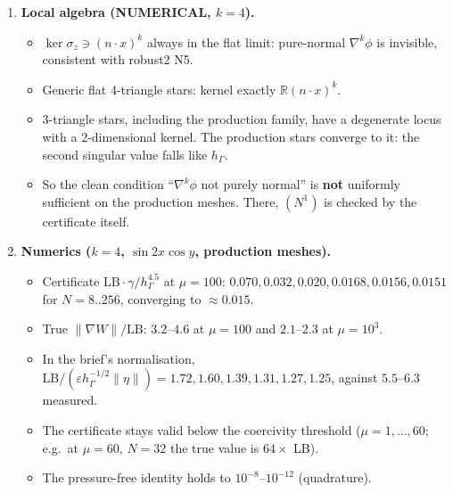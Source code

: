 \documentclass[11pt]{article}
\theoremstyle{remark}
\newcommand{\hG}{h_\Gamma}
\begin{document}
\begin{enumerate}
Combined with the upper bound of robust/ Thm~3.2(b), this gives
\[
c\,\gamma^{-1}\hG^{k+1/2}\le\|\nabla W_\ast\|\le C\gamma^{-1}\hG^{k+1/2}\qquad\text{for all }\gamma\ge\max(\gamma_2,1).
\]
This is the sharp order on the whole coercive range, and the lower half extends below it.
\item \textbf{Local algebra (NUMERICAL, $k=4$).}
 \begin{itemize}
 \item $\ker\sigma_z\ni(n\cdot x)^k$ always in the flat limit: pure-normal $\nabla^k\phi$ is invisible, consistent with robust2 N5.
 \item Generic flat 4-triangle stars: kernel exactly $\mathbb R(n\cdot x)^k$.
 \item 3-triangle stars, including the production family, have a degenerate locus with a 2-dimensional kernel. The
 production stars converge to it: the second singular value falls like $\hG$.
 \item So the clean condition ``$\nabla^k\phi$ not purely normal'' is \textbf{not} uniformly sufficient on the production
 meshes. There, $(N^1)$ is checked by the certificate itself.
 \end{itemize}
\item \textbf{Numerics ($k=4$, $\sin2x\cos y$, production meshes).}
 \begin{itemize}
 \item Certificate $\mathrm{LB}\cdot\gamma/\hG^{4.5}$ at $\mu=100$: $0.070,0.032,0.020,0.0168,0.0156,0.0151$ for $N=8..256$,
 converging to $\approx0.015$.
 \item True $\|\nabla W\|/\mathrm{LB}$: $3.2$--$4.6$ at $\mu=100$ and $2.1$--$2.3$ at $\mu=10^3$.
 \item In the brief's normalisation, $\mathrm{LB}/(\varepsilon\hG^{-1/2}\|\eta\|)=1.72,1.60,1.39,1.31,1.27,1.25$, against
 $5.5$--$6.3$ measured.
 \item The certificate stays valid below the coercivity threshold ($\mu=1,\dots,60$; e.g.\ at $\mu=60$, $N=32$ the true value is
 $64\times$ LB).
 \item The pressure-free identity holds to $10^{-8}$--$10^{-12}$ (quadrature).
 \end{itemize}
\end{enumerate}
\end{document}
